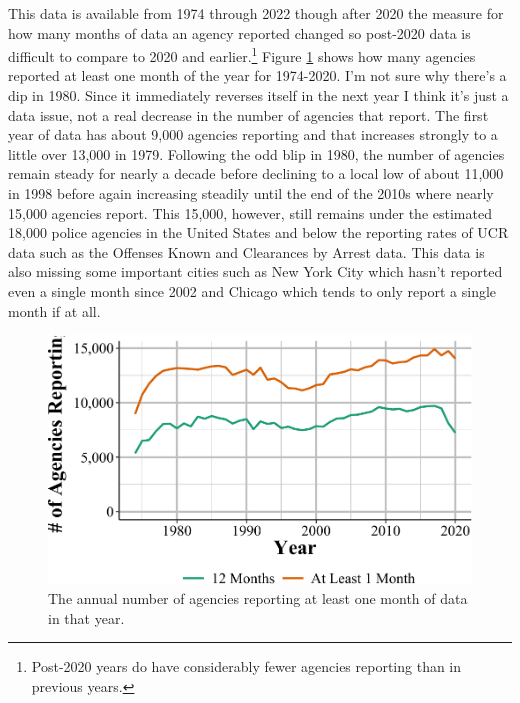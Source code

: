 \documentclass[
  12pt,
  openany]{book}
\begin{document}
This data is available from 1974 through 2022 though after 2020 the measure for how many months of data an agency reported changed so post-2020 data is difficult to compare to 2020 and earlier.\footnote{Post-2020 years do have considerably fewer agencies reporting than in previous years.} Figure \ref{fig:arrestsAgenciesReporting} shows how many agencies reported at least one month of the year for 1974-2020. I'm not sure why there's a dip in 1980. Since it immediately reverses itself in the next year I think it's just a data issue, not a real decrease in the number of agencies that report. The first year of data has about 9,000 agencies reporting and that increases strongly to a little over 13,000 in 1979. Following the odd blip in 1980, the number of agencies remain steady for nearly a decade before declining to a local low of about 11,000 in 1998 before again increasing steadily until the end of the 2010s where nearly 15,000 agencies report. This 15,000, however, still remains under the estimated 18,000 police agencies in the United States and below the reporting rates of UCR data such as the Offenses Known and Clearances by Arrest data. This data is also missing some important cities such as New York City which hasn't reported even a single month since 2002 and Chicago which tends to only report a single month if at all.

\begin{figure}

{\centering \includegraphics[width=0.9\linewidth]{05_arrests_files/figure-latex/arrestsAgenciesReporting-1} 

}

\caption{The annual number of agencies reporting at least one month of data in that year.}\label{fig:arrestsAgenciesReporting}
\end{figure}
\end{document}
